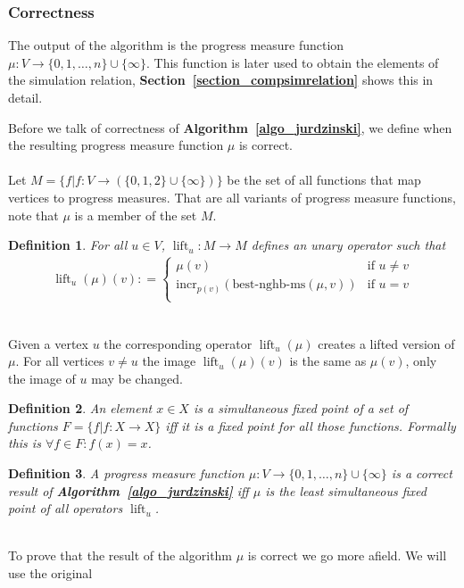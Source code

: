 \documentclass[12pt,oneside,bibliography=totoc,abstracton]{scrartcl}
\DeclareMathOperator{\lift}{lift}
\newcommand{\sectionref}[1]{\textbf{Section~\ref{#1}}}
\newcommand{\algoref}[1]{\textbf{Algorithm~\ref{#1}}}
\newtheorem{mydef}{Definition}
\begin{document}
\subsubsection{Correctness}\label{section_correctness}
The output of the algorithm is the progress measure function $\mu : V \to \{0, 1, \ldots, n\} \cup \{\infty\}$.
This function is later used to obtain the elements of the simulation relation,
\sectionref{section_compsimrelation} shows this in detail.

Before we talk of correctness of \algoref{algo_jurdzinski}, we define when the
resulting progress measure function $\mu$ is correct.\\\\
Let $M = \{f | f: V \to (\{0, 1, 2\} \cup \{\infty\})\}$ be the set of all functions that map vertices to progress measures.
That are all variants of progress measure functions, note that $\mu$ is a member of the set $M$.
\begin{mydef}
	For all $u \in V$, $\lift_u: M \to M$ defines an unary operator such that
	\begin{align*}
		\lift_u(\mu)(v): = \begin{cases} \mu(v) & \text{if } u \neq v\\
				\text{incr}_{p(v)}(\text{best-nghb-ms}(\mu, v)) & \text{if } u = v\\
			\end{cases}
	\end{align*}
\end{mydef}\quad\\
Given a vertex $u$ the corresponding operator $\lift_u(\mu)$ creates a lifted version of $\mu$.
For all vertices $v \neq u$ the image $\lift_u(\mu)(v)$ is the same as $\mu(v)$,
only the image of $u$ may be changed.
\begin{mydef}
	An element  $x \in X$ is a \textnormal{simultaneous fixed point} of a set of functions $F = \{f | f: X \to X\}$
	iff it is a \textnormal{fixed point} for all those functions. Formally this is $\forall f \in F: f(x) = x$.
\end{mydef}
\begin{mydef}\label{def_correctprogressmeasure}
	A progress measure function $\mu : V \to \{0, 1, \ldots, n\} \cup \{\infty\}$ is a \textnormal{correct result}
	of \algoref{algo_jurdzinski} iff $\mu$ is the \textnormal{least simultaneous fixed point} of all operators $\lift_u$.
\end{mydef}\quad\\
To prove that the result of the algorithm $\mu$ is correct we go more afield. We will use the original
\end{document}
